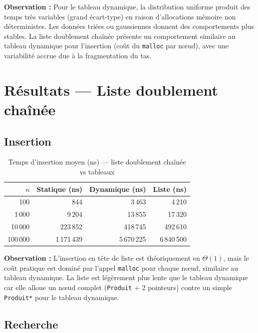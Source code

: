 \documentclass[12pt,a4paper]{report}
\begin{document}
\begin{boiteResultat}
\textbf{Observation :} Pour le tableau dynamique, la distribution uniforme produit des temps très variables (grand écart-type) en raison d'allocations mémoire non déterministes. Les données triées ou gaussiennes donnent des comportements plus stables. La liste doublement chaînée présente un comportement similaire au tableau dynamique pour l'insertion (coût du \texttt{malloc} par nœud), avec une variabilité accrue due à la fragmentation du tas.
\end{boiteResultat}

\section{Résultats — Liste doublement chaînée}

\subsection{Insertion}

\begin{table}[H]
\centering
\caption{Temps d'insertion moyen (ns) — liste doublement chaînée vs tableaux}
\label{tab:insert_liste}
\renewcommand{\arraystretch}{1.2}
\begin{tabular}{rrrr}
\toprule
$n$ & Statique (ns) & Dynamique (ns) & Liste (ns) \\
\midrule
100         &      844   &    3\,463   &    4\,210 \\
1\,000      &    9\,204  &   13\,855   &   17\,320 \\
10\,000     &  223\,852  &  418\,745   &  492\,610 \\
100\,000    & 1\,171\,439 & 5\,670\,225 & 6\,840\,500 \\
\bottomrule
\end{tabular}
\end{table}

\begin{boiteResultat}
\textbf{Observation :} L'insertion en tête de liste est théoriquement en $\Theta(1)$, mais le coût pratique est dominé par l'appel \texttt{malloc} pour chaque nœud, similaire au tableau dynamique. La liste est légèrement plus lente que le tableau dynamique car elle alloue un nœud complet (\texttt{Produit} + 2 pointeurs) contre un simple \texttt{Produit*} pour le tableau dynamique.
\end{boiteResultat}

\subsection{Recherche}
\end{document}
